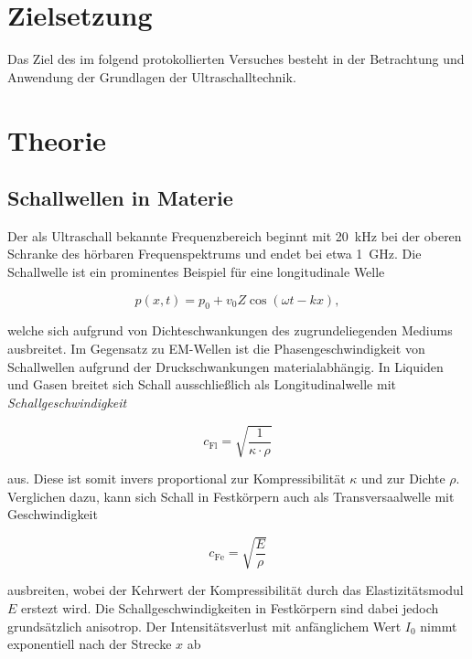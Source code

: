 



\section{Zielsetzung}

Das Ziel des im folgend protokollierten Versuches besteht in der Betrachtung und Anwendung der Grundlagen der 
Ultraschalltechnik.

\section{Theorie}
\label{sec:Theorie}

\subsection{Schallwellen in Materie}

\noindent Der als Ultraschall bekannte Frequenzbereich beginnt mit \qty{20}{\kilo\hertz} bei der oberen Schranke des hörbaren 
Frequenspektrums und endet bei etwa \qty{1}{\giga\hertz}. Die Schallwelle ist ein prominentes Beispiel für eine longitudinale 
Welle 

\begin{equation*}
    p\left(x,t\right) = p_0 + v_0Z\cos\left(\omega{}t - kx\right),
\end{equation*}

\noindent welche sich aufgrund von Dichteschwankungen des zugrundeliegenden Mediums ausbreitet. Im Gegensatz zu EM-Wellen ist 
die Phasengeschwindigkeit von Schallwellen aufgrund der Druckschwankungen materialabhängig. In Liquiden und Gasen breitet sich 
Schall ausschließlich als Longitudinalwelle mit \emph{Schallgeschwindigkeit}

\begin{equation*}
    c_\text{Fl} = \sqrt{\frac{1}{\kappa\cdot\rho}}
\end{equation*}

aus. Diese ist somit invers proportional zur Kompressibilität $\kappa$ und zur Dichte $\rho$. Verglichen dazu, kann sich Schall 
in Festkörpern auch als Transversaalwelle mit Geschwindigkeit 

\begin{equation*}
        c_\text{Fe} = \sqrt{\frac{E}{\rho}}
\end{equation*}

\noindent ausbreiten, wobei der Kehrwert der Kompressibilität durch das Elastizitätsmodul $E$ erstezt wird. Die Schallgeschwindigkeiten
in Festkörpern sind dabei jedoch grundsätzlich anisotrop. Der Intensitätsverlust mit anfänglichem Wert $I_0$ nimmt 
exponentiell nach der Strecke $x$ ab 

